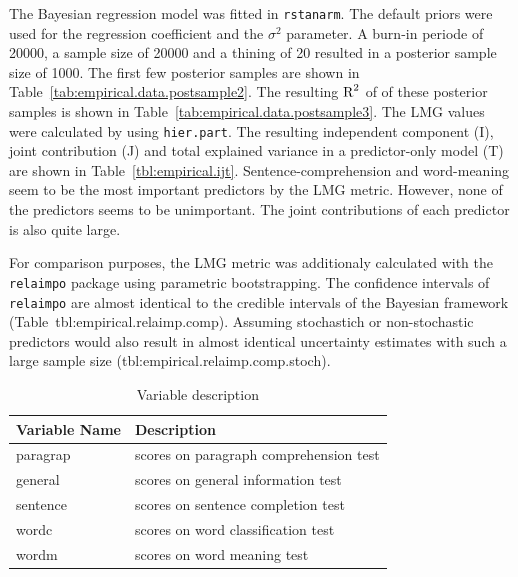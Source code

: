 \documentclass[11pt,a4paper,twoside]{book}
\begin{document}
The Bayesian regression model was fitted in \texttt{rstanarm}. The default priors were used for the regression coefficient and the $\sigma^2$ parameter.   A burn-in periode of 20000, a sample size of 20000 and a thining of 20 resulted in a posterior sample size of 1000. The first few posterior samples are shown in Table~\ref{tab:empirical.data.postsample2}. The resulting $\text{R}^2$ of of these posterior samples is shown in Table~\ref{tab:empirical.data.postsample3}. The LMG values were calculated by using \texttt{hier.part}. The resulting independent component (I), joint contribution (J) and total explained variance in a predictor-only model (T) are shown in Table~\ref{tbl:empirical.ijt}. Sentence-comprehension and word-meaning seem to be the most important predictors by the LMG metric. However, none of the predictors seems to be unimportant.  The joint contributions of each predictor is also quite large.

For comparison purposes, the LMG metric was additionaly calculated with the \texttt{relaimpo} package using parametric bootstrapping. The confidence intervals of  \texttt{relaimpo} are almost identical to the credible intervals of the Bayesian framework (Table~tbl:empirical.relaimp.comp). Assuming stochastich or non-stochastic predictors would also result in almost identical uncertainty estimates with such a large sample size (tbl:empirical.relaimp.comp.stoch). 







\begin{table}
\centering
\caption{Variable description}
\begin{tabular}{l l}
  \toprule			
  Variable Name & Description  \\   \midrule  
  paragrap & scores on paragraph comprehension test  \\
  general & scores on general information test \\
  sentence & scores on sentence completion test\\
  wordc & scores on word classification test \\
  wordm & scores on word meaning test \\
  \bottomrule  
\end{tabular}
\label{table:hs.data}
\end{table}
\end{document}
